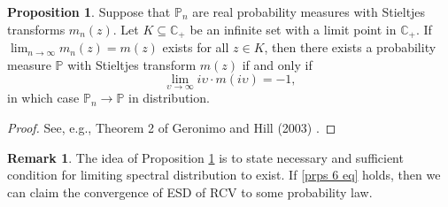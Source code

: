 \documentclass[a4paper,11pt]{book}
\theoremstyle{plain}
\theoremstyle{definition}
\newtheorem{rmrk}[thm]{Remark}
\newtheorem{prps}[thm]{Proposition}
\newcommand{\MP}{\mathbb{P}}
\begin{document}
    \begin{prps} \label{prps 6}
    	Suppose that $\mathbb{P}_n$ are real probability measures with Stieltjes transforms $m_n(z)$. Let $K \subseteq \mathbb{C}_+$ be an infinite set with a limit point in $\mathbb{C}_+$. If $\lim_{n \rightarrow \infty} m_n(z) = m(z)$ exists for all $z \in K$, then there exists a probability measure $\MP$ with Stieltjes transform $m(z)$ if and only if
    	\begin{equation} \label{prps 6 eq}
    		\lim_{\upsilon \rightarrow \infty} i\upsilon \cdot m(i \upsilon) = -1,
    	\end{equation}
    	in which case $\MP_n \rightarrow \MP$ in distribution.
    \end{prps}
    \begin{proof}
    	See, e.g., Theorem 2 of Geronimo and Hill (2003) \cite{GeronimoHill}.
    \end{proof}
    
    \begin{rmrk}
    	The idea of Proposition \ref{prps 6} is to state necessary and sufficient condition for limiting spectral distribution to exist. If \eqref{prps 6 eq} holds, then we can claim the convergence of ESD of RCV to some probability law.
    \end{rmrk}
    
\end{document}
